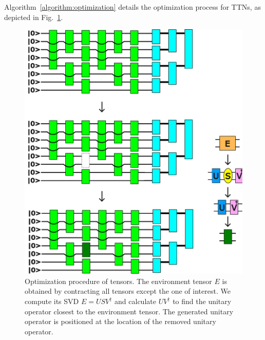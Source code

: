 \documentclass[12pt,dvipdfmx,twoside,openright]{report}
\begin{document}
Algorithm~\ref{algorithm:optimization} details the optimization process for TTNs, as depicted in Fig.~\ref{fig:optimization}.
\begin{figure}
    \centering
    \includegraphics[width=\linewidth]{fig-optimization.pdf}
    \caption{Optimization procedure of tensors. The environment tensor $E$ is obtained by contracting all tensors except the one of interest. We compute its SVD $E=USV^\dagger$ and calculate $UV^\dagger$ to find the unitary operator closest to the environment tensor. The generated unitary operator is positioned at the location of the removed unitary operator.}
    \label{fig:optimization}
\end{figure}
\end{document}
